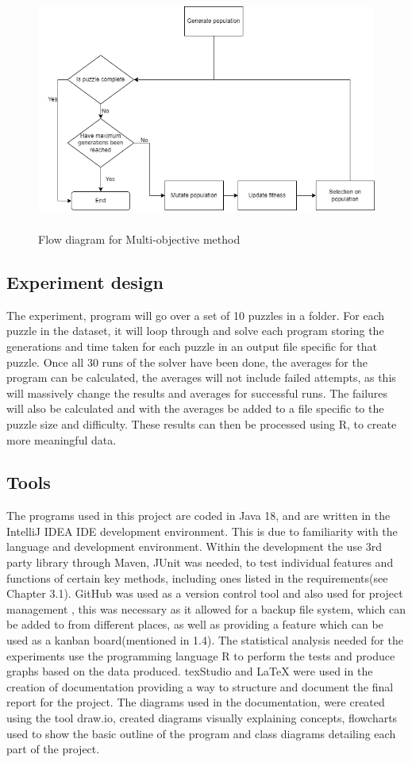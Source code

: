 \documentclass[a4paper,11pt]{article}
\begin{document}
\begin{figure}[h]
	\caption{Flow diagram for Multi-objective method}
	\centering
	\includegraphics[height=8cm,width=15cm]{./Diagrams/multiobjectiveFlowchart}
\end{figure}

\subsection{Experiment design}

The experiment, program will go over a set of 10 puzzles in a folder. For each puzzle in the dataset, it will loop through and solve each program storing the generations and time taken for each puzzle in an output file specific for that puzzle. Once all 30 runs of the solver have been done, the averages for the program can be calculated, the averages will not include failed attempts, as this will massively change the results and averages for successful runs. The failures will also be calculated and with the averages be added to a file specific to the puzzle size and difficulty. These results can then be processed using R, to create more meaningful data.
 
\subsection{Tools}
The programs used in this project are coded in Java 18, and are written in the IntelliJ IDEA IDE development environment. This is due to familiarity with the language and development environment. Within the development the use 3rd party library through Maven, JUnit was needed, to test individual features and functions of certain key methods, including ones listed in the requirements(see Chapter 3.1). GitHub was used as a version control tool and also used for project management , this was necessary as it allowed for a backup file system, which can be added to from different places, as well as providing a feature which can be used as a kanban board(mentioned in 1.4).
The statistical analysis needed for the experiments use the programming language R to perform the tests and produce graphs based on the data produced. texStudio and LaTeX were used in the creation of documentation providing a way to structure and document the final report for the project. The diagrams used in the documentation, were created using the tool draw.io, created diagrams visually explaining concepts, flowcharts used to show the basic outline of the program and class diagrams detailing each part of the project. 
\end{document}
